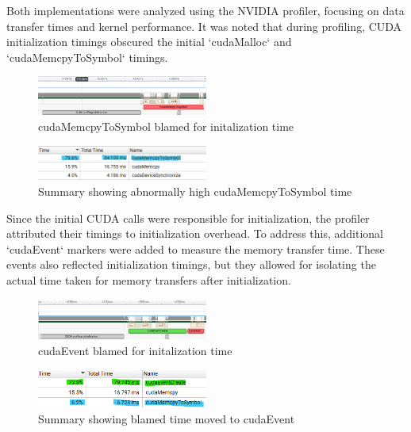 \documentclass[journal,11pt]{IEEEtran}
\begin{document}
Both implementations were analyzed using the NVIDIA profiler, focusing on data transfer times and kernel performance. It was noted that during profiling, CUDA initialization timings obscured the initial `cudaMalloc` and `cudaMemcpyToSymbol` timings.
\vspace{-1.2em}\\
\begin{figure}[h]
    \centering
    \includegraphics[width=0.5\textwidth]{assets/blamed-mem.png}
    \caption{cudaMemcpyToSymbol blamed for initalization time}
    \label{fig:2}
\end{figure}
\vspace{-0.2em}
\begin{figure}[h]
    \centering
    \includegraphics[width=0.5\textwidth]{assets/blamed-mem-sum.png}
    \caption{Summary showing abnormally high cudaMemcpyToSymbol time}
    \label{fig:3}
\end{figure}

Since the initial CUDA calls were responsible for initialization, the profiler attributed their timings to initialization overhead. To address this, additional `cudaEvent` markers were added to measure the memory transfer time. These events also reflected initialization timings, but they allowed for isolating the actual time taken for memory transfers after initialization.

\begin{figure}[h]
    \centering
    \includegraphics[width=0.5\textwidth]{assets/blamed-event.png}
    \caption{cudaEvent blamed for initalization time}
    \label{fig:4}
\end{figure}
\vspace{-0.2em}
\begin{figure}[h]
    \centering
    \includegraphics[width=0.5\textwidth]{assets/blamed-event-sum.png}
    \caption{Summary showing blamed time moved to cudaEvent}
    \label{fig:5}
\end{figure}
\end{document}
